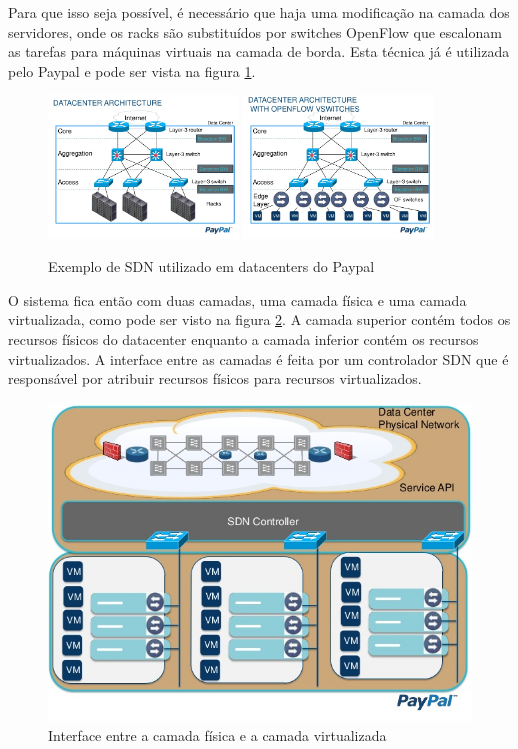 \documentclass[12pt,a4paper]{report}
\begin{document}
Para que isso seja possível, é necessário que haja uma modificação na camada dos servidores, onde os racks são substituídos por switches OpenFlow que escalonam as tarefas para máquinas virtuais na camada de borda. Esta técnica já é utilizada pelo Paypal e pode ser vista na figura \ref{paypal}.\\

\begin{figure}[H]
\centering
\includegraphics[width=0.45\textwidth]{imagens/sdn-1.jpg}
\includegraphics[width=0.45\textwidth]{imagens/sdn-2.jpg}
\caption{Exemplo de SDN utilizado em datacenters do Paypal}
\label{paypal}
\end{figure}

O sistema fica então com duas camadas, uma camada física e uma camada virtualizada, como pode ser visto na figura \ref{sdn2}. A camada superior contém todos os recursos físicos do datacenter enquanto a camada inferior contém os recursos virtualizados. A interface entre as camadas é feita por um controlador SDN que é responsável por atribuir recursos físicos para recursos virtualizados.\\

\begin{figure}[H]
\centering
\includegraphics[width=.8\textwidth]{imagens/sdn-3.jpg}
\caption{Interface entre a camada física e a camada virtualizada}
\label{sdn2}
\end{figure}
\end{document}
